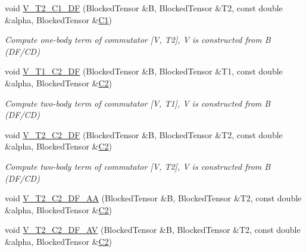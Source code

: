 \begin{DoxyCompactItemize}
void \mbox{\hyperlink{classforte_1_1_d_s_r_g___m_r_p_t3_a9546d1b6861d0b5b222011d1339bf40b}{V\+\_\+\+T2\+\_\+\+C1\+\_\+\+DF}} (Blocked\+Tensor \&B, Blocked\+Tensor \&T2, const double \&alpha, Blocked\+Tensor \&\mbox{\hyperlink{namespaceforte_abe00ec86d0015c0f2b6ac298c6e428e4a1a2ddc2db4693cfd16d534cde5572cc1}{C1}})
\begin{DoxyCompactList}\small\item\em Compute one-\/body term of commutator \mbox{[}V, T2\mbox{]}, V is constructed from B (D\+F/\+CD) \end{DoxyCompactList}\item 
void \mbox{\hyperlink{classforte_1_1_d_s_r_g___m_r_p_t3_a40d599393dfce102715ffdc027b2c88b}{V\+\_\+\+T1\+\_\+\+C2\+\_\+\+DF}} (Blocked\+Tensor \&B, Blocked\+Tensor \&T1, const double \&alpha, Blocked\+Tensor \&\mbox{\hyperlink{namespaceforte_abe00ec86d0015c0f2b6ac298c6e428e4af1a543f5a2c5d49bc5dde298fcf716e4}{C2}})
\begin{DoxyCompactList}\small\item\em Compute two-\/body term of commutator \mbox{[}V, T1\mbox{]}, V is constructed from B (D\+F/\+CD) \end{DoxyCompactList}\item 
void \mbox{\hyperlink{classforte_1_1_d_s_r_g___m_r_p_t3_ab71c3b2fafa76b719d08acb4000d527b}{V\+\_\+\+T2\+\_\+\+C2\+\_\+\+DF}} (Blocked\+Tensor \&B, Blocked\+Tensor \&T2, const double \&alpha, Blocked\+Tensor \&\mbox{\hyperlink{namespaceforte_abe00ec86d0015c0f2b6ac298c6e428e4af1a543f5a2c5d49bc5dde298fcf716e4}{C2}})
\begin{DoxyCompactList}\small\item\em Compute two-\/body term of commutator \mbox{[}V, T2\mbox{]}, V is constructed from B (D\+F/\+CD) \end{DoxyCompactList}\item 
void \mbox{\hyperlink{classforte_1_1_d_s_r_g___m_r_p_t3_a48e6f20b01fa4ebdf3fcb3b2444b8443}{V\+\_\+\+T2\+\_\+\+C2\+\_\+\+D\+F\+\_\+\+AA}} (Blocked\+Tensor \&B, Blocked\+Tensor \&T2, const double \&alpha, Blocked\+Tensor \&\mbox{\hyperlink{namespaceforte_abe00ec86d0015c0f2b6ac298c6e428e4af1a543f5a2c5d49bc5dde298fcf716e4}{C2}})
\item 
void \mbox{\hyperlink{classforte_1_1_d_s_r_g___m_r_p_t3_a91c900ea22e66c97bb0db18c8f49e8cb}{V\+\_\+\+T2\+\_\+\+C2\+\_\+\+D\+F\+\_\+\+AV}} (Blocked\+Tensor \&B, Blocked\+Tensor \&T2, const double \&alpha, Blocked\+Tensor \&\mbox{\hyperlink{namespaceforte_abe00ec86d0015c0f2b6ac298c6e428e4af1a543f5a2c5d49bc5dde298fcf716e4}{C2}})

\end{DoxyCompactItemize}

